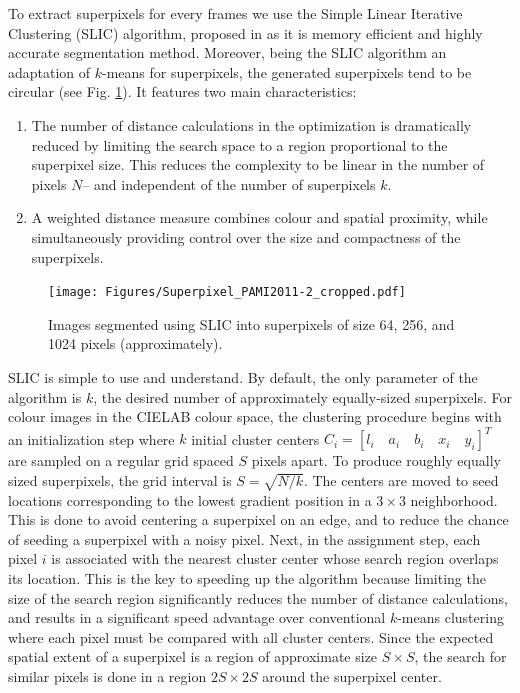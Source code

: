 To extract superpixels for every frames we use the Simple Linear Iterative Clustering (SLIC) algorithm, proposed in \cite{achanta12} as it is memory efficient and highly accurate segmentation method. Moreover, being the SLIC algorithm an adaptation of $k$-means for superpixels, the generated superpixels tend to be circular (see Fig. \ref{fig:SLIC}). It features two main characteristics:
\begin{enumerate}
\item The number of distance calculations in the optimization is dramatically reduced by limiting the search space to a
region proportional to the superpixel size. This reduces the complexity to be linear in the number of pixels $N$– and independent of the number of superpixels $k$.
\item A weighted distance measure combines colour and spatial proximity, while simultaneously providing control over the size and compactness of the superpixels.
\end{enumerate}

\begin{figure}[htbp]
	\centering
		\texttt{[image: Figures/Superpixel\_PAMI2011-2\_cropped.pdf]}
	\caption{Images segmented using SLIC into superpixels of size 64, 256,
and 1024 pixels (approximately).}
	\label{fig:SLIC}
\end{figure}

SLIC is simple to use and understand. By default, the only parameter of the algorithm is $k$, the desired number of approximately equally-sized superpixels. For colour images in the CIELAB colour space, the clustering procedure begins with an initialization step where $k$ initial cluster centers $C_i = [l_i \quad a_i \quad b_i \quad x_i \quad y_i]^T$ are sampled on a regular grid spaced $S$ pixels apart. To produce roughly equally sized superpixels, the grid interval is $S =\sqrt{N/k}$. The centers are moved to seed locations corresponding to the lowest gradient position in a $3\times 3$ neighborhood. This is done to avoid centering a superpixel on an edge, and to reduce the chance of seeding a superpixel with a noisy pixel. Next, in the assignment step, each pixel $i$ is associated with the nearest cluster center whose search region overlaps its location. This is the key to speeding up the algorithm because limiting the size of the search region
significantly reduces the number of distance calculations, and results in a significant speed advantage over conventional $k$-means clustering where each pixel must be compared with all cluster centers. Since the expected spatial extent of a superpixel is a region of
approximate size $S\times S$, the search for similar pixels is done in a region $2S \times 2S$ around the superpixel center.

